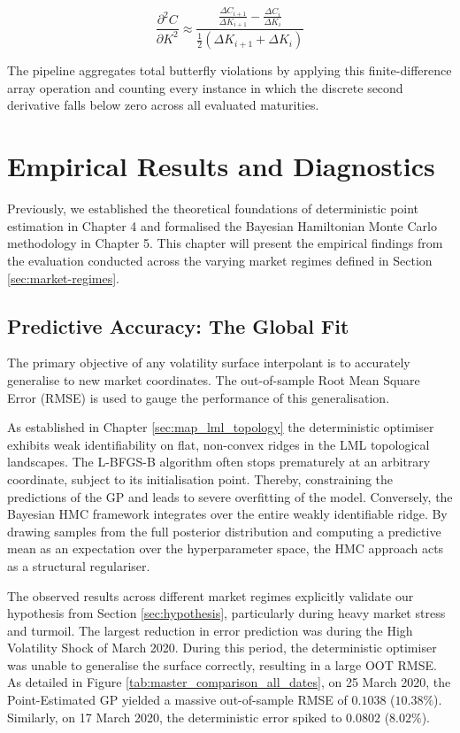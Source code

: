 \documentclass[12pt,oneside]{report}
\theoremstyle{definition}
\theoremstyle{remark}
\begin{document}
\begin{enumerate}
\begin{equation}
    \frac{\partial^2 C}{\partial K^2} \approx \frac{\frac{\Delta C_{i+1}}{\Delta K_{i+1}} - \frac{\Delta C_i}{\Delta K_i}}{\frac{1}{2}(\Delta K_{i+1} + \Delta K_i)}
\end{equation}

The pipeline aggregates total butterfly violations by applying this finite-difference array operation and counting every instance in which the discrete second derivative falls below zero across all evaluated maturities.
\end{enumerate}


\chapter{Empirical Results and Diagnostics}

Previously, we established the theoretical foundations of deterministic point estimation in Chapter 4 and formalised the Bayesian Hamiltonian Monte Carlo methodology in Chapter 5. This chapter will present the empirical findings from the evaluation conducted across the varying market regimes defined in Section \ref{sec:market-regimes}.

\section{Predictive Accuracy: The Global Fit}
\label{sec:the_global_fit}
The primary objective of any volatility surface interpolant is to accurately generalise to new market coordinates. The out-of-sample Root Mean Square Error (RMSE) is used to gauge the performance of this generalisation. 

As established in Chapter \ref{sec:map_lml_topology}  the deterministic optimiser exhibits weak identifiability on flat, non-convex ridges in the LML topological landscapes. The L-BFGS-B algorithm often stops prematurely at an arbitrary coordinate, subject to its initialisation point. Thereby, constraining the predictions of the GP and leads to severe overfitting of the model. Conversely, the Bayesian HMC framework integrates over the entire weakly identifiable ridge. By drawing samples from the full posterior distribution and computing a predictive mean as an expectation over the hyperparameter space, the HMC approach acts as a structural regulariser. 


The observed results across different market regimes explicitly validate our hypothesis from Section \ref{sec:hypothesis}, particularly during heavy market stress and turmoil. The largest reduction in error prediction was during the High Volatility Shock of March 2020. During this period, the deterministic optimiser was unable to generalise the surface correctly, resulting in a large OOT RMSE. As detailed in Figure \ref{tab:master_comparison_all_dates}, on 25 March 2020, the Point-Estimated GP yielded a massive out-of-sample RMSE of $0.1038$ ($10.38\%$). Similarly, on 17 March 2020, the deterministic error spiked to $0.0802$ ($8.02\%$).
\end{document}
